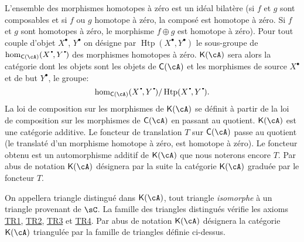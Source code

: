 \subsubsection{}\label{VIII:1-2-2}

L'ensemble des morphismes homotopes \`a z\'ero est un id\'eal bilat\`ere (si 
$f$ et $g$ sont composables et si $f$ ou $g$ homotope \`a z\'ero, la compos\'e 
est homotope \`a z\'ero. Si $f$ et $g$ sont homotopes \`a z\'ero, le morphisme 
$f\oplus g$ est homotope \`a z\'ero). Pour tout couple d'objet $X^\bullet$, 
$Y^\bullet$ on d\'esigne par $\operatorname{Htp}(X^\bullet,Y^\bullet)$ le 
sous-groupe de $\hom_{\eC(\cA)}(X^\bullet,Y^\bullet)$ des morphismes homotopes 
\`a z\'ero. $\eK(\cA)$ sera alors la cat\'egorie dont les objets sont les 
objets de $\eC(\cA)$ et les morphismes de source $X^\bullet$ et de but 
$Y^\bullet$, le groupe: 
\[
  \hom_{\eC(\cA)}(X^\bullet,Y^\bullet) / \operatorname{Htp}(X^\bullet,Y^\bullet) \text{.}
\]
La loi de composition sur les morphismes de $\eK(\cA)$ se d\'efinit \`a partir 
de la loi de composition sur les morphismes de $\eC(\cA)$ en passant au 
quotient. $\eK(\cA)$ est une cat\'egorie additive. Le foncteur de translation 
$T$ sur $\eC(\cA)$ passe au quotient (le translat\'e d'un morphisme homotope 
\`a z\'ero, est homotope \`a z\'ero). Le foncteur obtenu est un automorphisme 
additif de $\eK(\cA)$ que nous noterons encore $T$. Par abus de notation 
$\eK(\cA)$ d\'esignera par la suite la cat\'egorie $\eK(\cA)$ gradu\'ee par le 
foncteur $T$. 

On appellera triangle distingu\'e dans $\eK(\cA)$, tout triangle 
\emph{isomorphe} \`a un triangle provenant de $\sC$. La famille des triangles 
distingu\'es v\'erifie les axioms \hyperlink{VIII:TR1}{TR1}, 
\hyperlink{VIII:TR2}{TR2}, \hyperlink{VIII:TR3}{TR3} et 
\hyperlink{VIII:TR4}{TR4}. Par abus de notation $\eK(\cA)$ d\'esignera la 
cat\'egorie $\eK(\cA)$ triangul\'ee par la famille de triangles d\'efinie 
ci-dessus. 





\subsubsection{}\label{VIII:1-2-3}

